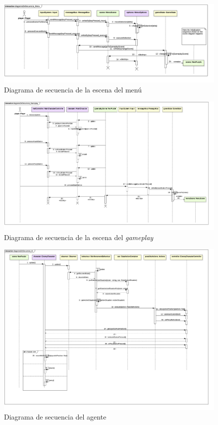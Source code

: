 \begin{landscape}
\begin{figure}
	\centerline{\includegraphics[width=20cm]{otros/UML/png/alld/png/CasosDeUso__Especifico__Collaboration1__Interaction1__diagramaDeSecuencia_Menu_17.png}}
	\caption{Diagrama de secuencia de la escena del menú}
	\label{sec:menu}
\end{figure}
\end{landscape}

\begin{figure}
	\centerline{\includegraphics[width=19cm]{otros/UML/png/alld/png/CasosDeUso__Especifico__Collaboration2__Interaction1__diagramaDeSecuencia_Gameplay_18.png}}
	\caption{Diagrama de secuencia de la escena del \textit{gameplay}}
	\label{sec:gameplay}
\end{figure}

\begin{figure}
	\centerline{\includegraphics[width=19cm]{otros/UML/png/alld/png/CasosDeUso__Especifico__Collaboration3__Interaction1__diagramaDeSecuencia_IA_19.png}}
	\caption{Diagrama de secuencia del agente}
	\label{sec:agent}
\end{figure}

